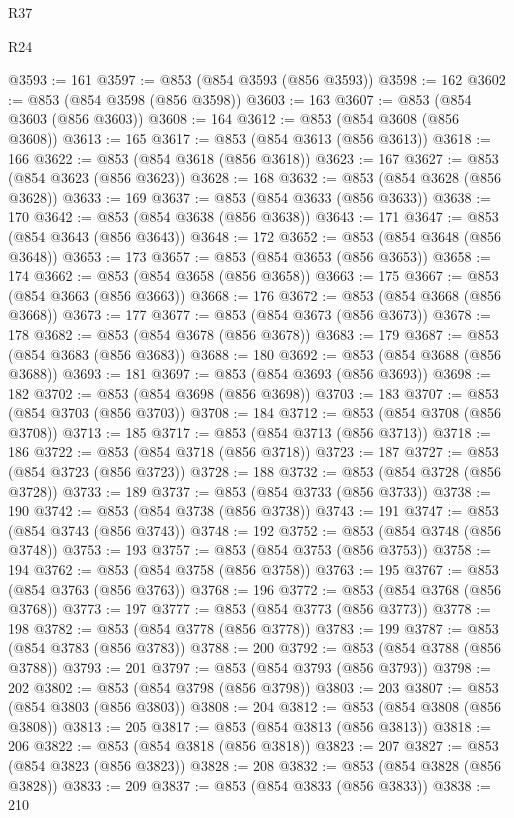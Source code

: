 \begin{lexlean}{R37}
\begin{lexlean}{R24}
\begin{coremodule}
{{{{{{{{{{{{{{{{{{{{{{{{{{{{{{{{{{{{{{{{{{{{{{{{{{{{{{{{{{{{{{{{{{{{{{{{{{{{{{{{{{{{{{{{{{{{{{{{{{{{{{{{{{{{{{{{{{{{{{{{{{{{{{{{{{{{{{{{{{{{{{{{{{{{{{{{{{{{{{{{{{{{{{{{{{{{{{{{{{{{{{{{{@3593 := 161
@3597 := @853 (@854 @3593 (@856 @3593))
@3598 := 162
@3602 := @853 (@854 @3598 (@856 @3598))
@3603 := 163
@3607 := @853 (@854 @3603 (@856 @3603))
@3608 := 164
@3612 := @853 (@854 @3608 (@856 @3608))
@3613 := 165
@3617 := @853 (@854 @3613 (@856 @3613))
@3618 := 166
@3622 := @853 (@854 @3618 (@856 @3618))
@3623 := 167
@3627 := @853 (@854 @3623 (@856 @3623))
@3628 := 168
@3632 := @853 (@854 @3628 (@856 @3628))
@3633 := 169
@3637 := @853 (@854 @3633 (@856 @3633))
@3638 := 170
@3642 := @853 (@854 @3638 (@856 @3638))
@3643 := 171
@3647 := @853 (@854 @3643 (@856 @3643))
@3648 := 172
@3652 := @853 (@854 @3648 (@856 @3648))
@3653 := 173
@3657 := @853 (@854 @3653 (@856 @3653))
@3658 := 174
@3662 := @853 (@854 @3658 (@856 @3658))
@3663 := 175
@3667 := @853 (@854 @3663 (@856 @3663))
@3668 := 176
@3672 := @853 (@854 @3668 (@856 @3668))
@3673 := 177
@3677 := @853 (@854 @3673 (@856 @3673))
@3678 := 178
@3682 := @853 (@854 @3678 (@856 @3678))
@3683 := 179
@3687 := @853 (@854 @3683 (@856 @3683))
@3688 := 180
@3692 := @853 (@854 @3688 (@856 @3688))
@3693 := 181
@3697 := @853 (@854 @3693 (@856 @3693))
@3698 := 182
@3702 := @853 (@854 @3698 (@856 @3698))
@3703 := 183
@3707 := @853 (@854 @3703 (@856 @3703))
@3708 := 184
@3712 := @853 (@854 @3708 (@856 @3708))
@3713 := 185
@3717 := @853 (@854 @3713 (@856 @3713))
@3718 := 186
@3722 := @853 (@854 @3718 (@856 @3718))
@3723 := 187
@3727 := @853 (@854 @3723 (@856 @3723))
@3728 := 188
@3732 := @853 (@854 @3728 (@856 @3728))
@3733 := 189
@3737 := @853 (@854 @3733 (@856 @3733))
@3738 := 190
@3742 := @853 (@854 @3738 (@856 @3738))
@3743 := 191
@3747 := @853 (@854 @3743 (@856 @3743))
@3748 := 192
@3752 := @853 (@854 @3748 (@856 @3748))
@3753 := 193
@3757 := @853 (@854 @3753 (@856 @3753))
@3758 := 194
@3762 := @853 (@854 @3758 (@856 @3758))
@3763 := 195
@3767 := @853 (@854 @3763 (@856 @3763))
@3768 := 196
@3772 := @853 (@854 @3768 (@856 @3768))
@3773 := 197
@3777 := @853 (@854 @3773 (@856 @3773))
@3778 := 198
@3782 := @853 (@854 @3778 (@856 @3778))
@3783 := 199
@3787 := @853 (@854 @3783 (@856 @3783))
@3788 := 200
@3792 := @853 (@854 @3788 (@856 @3788))
@3793 := 201
@3797 := @853 (@854 @3793 (@856 @3793))
@3798 := 202
@3802 := @853 (@854 @3798 (@856 @3798))
@3803 := 203
@3807 := @853 (@854 @3803 (@856 @3803))
@3808 := 204
@3812 := @853 (@854 @3808 (@856 @3808))
@3813 := 205
@3817 := @853 (@854 @3813 (@856 @3813))
@3818 := 206
@3822 := @853 (@854 @3818 (@856 @3818))
@3823 := 207
@3827 := @853 (@854 @3823 (@856 @3823))
@3828 := 208
@3832 := @853 (@854 @3828 (@856 @3828))
@3833 := 209
@3837 := @853 (@854 @3833 (@856 @3833))
@3838 := 210
}}}}}}}}}}}}}}}}}}}}}}}}}}}}}}}}}}}}}}}}}}}}}}}}}}}}}}}}}}}}}}}}}}}}}}}}}}}}}}}}}}}}}}}}}}}}}}}}}}}}}}}}}}}}}}}}}}}}}}}}}}}}}}}}}}}}}}}}}}}}}}}}}}}}}}}}}}}}}}}}}}}}}}}}}}}}}}}}}}}}}}}}}
\end{coremodule}
\end{lexlean}
\end{lexlean}
